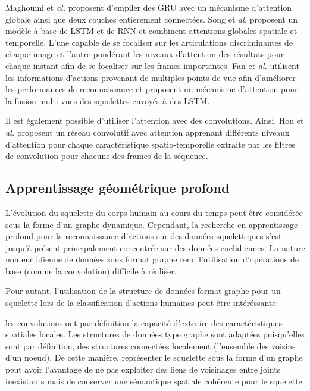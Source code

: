  

Maghoumi et\textit{ al.}\cite{maghoumi2019deepgru} proposent d'empiler des GRU avec un mécanisme d'attention globale ainsi que deux couches entièrement connectées. Song et\textit{ al.}\cite{song2017end} proposent un modèle à base de LSTM et de RNN et combinent attentions globales spatiale et temporelle. L'une capable de se focaliser sur les articulations discriminantes de chaque image et  l'autre pondérant les niveaux d'attention des résultats pour chaque instant afin de se focaliser sur les frames importantes. Fan et\textit{ al.}\cite{Fan2019AttentionBasedMR} utilisent les informations d'actions provenant de multiples points de vue afin d'améliorer les performances de reconnaissance et proposent un mécanisme d'attention pour la fusion multi-vues des squelettes envoyés à des LSTM. 

Il est également possible d'utiliser l'attention avec des convolutions.
Ainsi, Hou et\textit{ al.}\cite{hou2018spatial} proposent un réseau convolutif avec attention apprenant différents niveaux d'attention pour chaque caractéristique spatio-temporelle extraite par les filtres de convolution pour chacune des  frames de la séquence.

\subsection{Apprentissage géométrique profond}
L'évolution du squelette du corps humain au cours du temps peut être considérée sous la forme d'un graphe dynamique. Cependant, la recherche en apprentissage profond pour la reconnaissance d'actions sur des données squelettiques s'est jusqu'à présent principalement concentrée sur des données euclidiennes.
La nature non euclidienne de données sous format graphe rend l'utilisation d'opérations de base (comme la convolution) difficile à réaliser. 

Pour autant, l'utilisation de la structure de données format graphe pour un squelette lors de la classification d'actions humaines peut être intéréssante:

les convolutions ont par définition la capacité d'extraire des caractéristiques spatiales locales. Les structures de données type graphe sont adaptées puisqu'elles sont par définition, des structures connectées localement (l’ensemble des voisins d’un noeud). De cette manière, représenter le squelette sous la forme d'un graphe peut avoir l'avantage de ne pas exploiter des liens de voisinages entre joints inexistants mais de conserver une sémantique spatiale cohérente pour le squelette.

